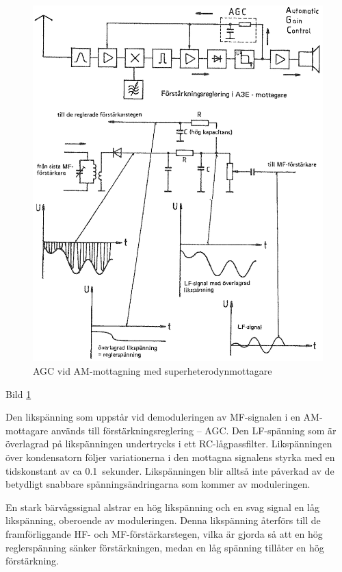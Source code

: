 \begin{figure}
  \includegraphics[width=\textwidth]{images/cropped_pdfs/bild_2_4-20.pdf}
  \caption{AGC vid AM-mottagning med superheterodynmottagare}
  \label{fig:bildII4-20}
\end{figure}

Bild \ref{fig:bildII4-20}

Den likspänning som uppstår vid demoduleringen av MF-signalen i en
AM-mottagare används till förstärkningsreglering -- AGC. Den
LF-spänning som är överlagrad på likspänningen undertrycks i ett
RC-lågpassfilter. Likspänningen över kondensatorn följer variationerna
i den mottagna signalens styrka med en tidskonstant av ca 0.1~sekunder.
Likspänningen blir alltså inte påverkad av de betydligt snabbare
spänningsändringarna som kommer av moduleringen.

En stark bärvågssignal alstrar en hög likspänning och en svag signal
en låg likspänning, oberoende av moduleringen. Denna likspänning
återförs till de framförliggande HF- och MF-förstärkarstegen, vilka är
gjorda så att en hög reglerspänning sänker förstärkningen, medan en
låg spänning tillåter en hög förstärkning.

